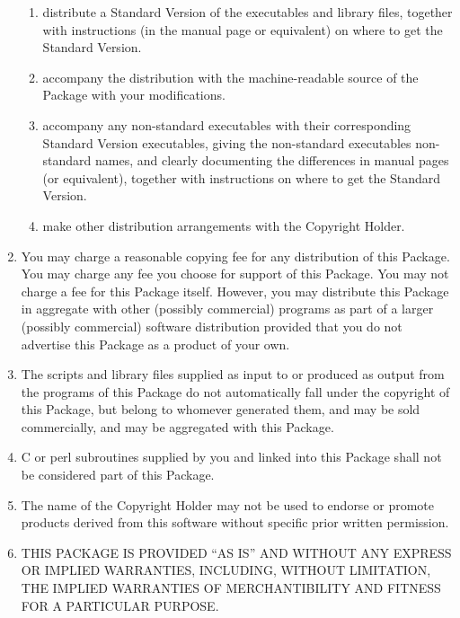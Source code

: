 \begin{enumerate}
  \begin{enumerate}
  \item distribute a Standard Version of the executables and library
    files, together with instructions (in the manual page or
    equivalent) on where to get the Standard Version.
  \item accompany the distribution with the machine-readable source of
    the Package with your modifications.
  \item accompany any non-standard executables with their
    corresponding Standard Version executables, giving the
    non-standard executables non-standard names, and clearly
    documenting the differences in manual pages (or equivalent),
    together with instructions on where to get the Standard Version.
  \item make other distribution arrangements with the Copyright
    Holder.
  \end{enumerate}
  
\item You may charge a reasonable copying fee for any distribution of
  this Package. You may charge any fee you choose for support of this
  Package. You may not charge a fee for this Package itself. However,
  you may distribute this Package in aggregate with other (possibly
  commercial) programs as part of a larger (possibly commercial)
  software distribution provided that you do not advertise this
  Package as a product of your own.
\item The scripts and library files supplied as input to or produced
  as output from the programs of this Package do not automatically
  fall under the copyright of this Package, but belong to whomever
  generated them, and may be sold commercially, and may be aggregated
  with this Package.
\item C or perl subroutines supplied by you and linked into this
  Package shall not be considered part of this Package.
\item The name of the Copyright Holder may not be used to endorse or
  promote products derived from this software without specific prior
  written permission.
\item THIS PACKAGE IS PROVIDED ``AS IS'' AND WITHOUT ANY EXPRESS OR
  IMPLIED WARRANTIES, INCLUDING, WITHOUT LIMITATION, THE IMPLIED
  WARRANTIES OF MERCHANTIBILITY AND FITNESS FOR A PARTICULAR PURPOSE.
\end{enumerate}
 
\renewcommand{\labelenumii}{\savelabelenumii}


